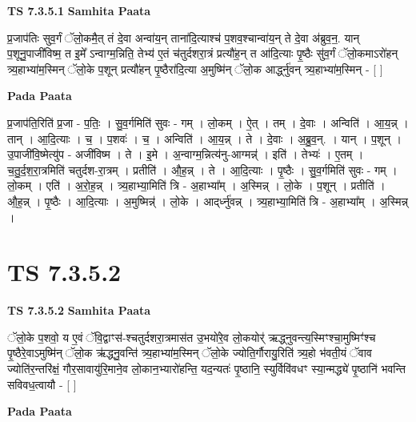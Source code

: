 \documentclass[17pt]{extarticle}
\begin{document}
\textbf{TS 7.3.5.1 } \newline
\textbf{Samhita Paata} \newline

प्र॒जाप॑तिः सुव॒र्गं ॅलो॒कमै॒त् तं दे॒वा अन्वा॑य॒न् ताना॑दि॒त्याश्च॑ प॒शव॒श्चान्वा॑य॒न् ते दे॒वा अ॑ब्रुव॒न॒. यान् प॒शूनु॒पाजी॑विष्म॒ त इ॒मे᳚ ऽन्वाग्म॒न्निति॒ तेभ्य॑ ए॒तं च॑तुर्दशरा॒त्रं प्रत्यौ॑ह॒न् त आ॑दि॒त्याः पृ॒ष्ठैः सु॑व॒र्गं ॅलो॒कमाऽरो॑हन् त्र्य॒हाभ्या॑म॒स्मिन् ॅलो॒के प॒शून् प्रत्यौ॑हन् पृ॒ष्ठैरा॑दि॒त्या अ॒मुष्मि॑न् ॅलो॒क आर्द्ध्नु॑वन् त्र्य॒हाभ्या॑म॒स्मिन् - [  ] \newline

\textbf{Pada Paata} \newline

प्र॒जाप॑ति॒रिति॑ प्र॒जा - प॒तिः॒ । सु॒व॒र्गमिति॑ सुवः - गम् । लो॒कम् । ऐ॒त् । तम् । दे॒वाः । अन्विति॑ । आ॒य॒न्न् । तान् । आ॒दि॒त्याः । च॒ । प॒शवः॑ । च॒ । अन्विति॑ । आ॒य॒न्न् । ते । दे॒वाः । अ॒ब्रु॒व॒न्. । यान् । प॒शून् । उ॒पाजी॑वि॒ष्मेत्यु॑प - अजी॑विष्म । ते । इ॒मे । अ॒न्वाग्म॒न्नित्य॑नु-आग्मन्न्॑ । इति॑ । तेभ्यः॑ । ए॒तम् । च॒तु॒र्द॒श॒रा॒त्रमिति॑ चतुर्दश-रा॒त्रम् । प्रतीति॑ । औ॒ह॒न्न् । ते । आ॒दि॒त्याः । पृ॒ष्ठैः । सु॒व॒र्गमिति॑ सुवः - गम् । लो॒कम् । एति॑ । अ॒रो॒ह॒न्न् । त्र्य॒हाभ्या॒मिति॑ त्रि - अ॒हाभ्या᳚म् । अ॒स्मिन्न् । लो॒के । प॒शून् । प्रतीति॑ । औ॒ह॒न्न् । पृ॒ष्ठैः । आ॒दि॒त्याः । अ॒मुष्मिन्न्॑ । लो॒के । आद्‌र्ध्नु॑वन्न् । त्र्य॒हाभ्या॒मिति॑ त्रि - अ॒हाभ्या᳚म् । अ॒स्मिन्न् ।  \newline




\section*{ TS 7.3.5.2 }

\textbf{TS 7.3.5.2 } \newline
\textbf{Samhita Paata} \newline

ॅलो॒के प॒शवो॒ य ए॒वं ॅवि॒द्वाꣳस॑-श्चतुर्दशरा॒त्रमास॑त उ॒भयो॑रे॒व लो॒कयोर्॑ ऋद्ध्नुवन्त्य॒स्मिꣳश्चा॒मुष्मिꣳ॑श्च पृ॒ष्ठैरे॒वाऽमुष्मि॑न् ॅलो॒क ऋ॑द्ध्नु॒वन्ति॑ त्र्य॒हाभ्या॑म॒स्मिन् ॅलो॒के ज्योति॒र्गौरायु॒रिति॑ त्र्य॒हो भ॑वती॒यं ॅवाव ज्योति॑र॒न्तरि॑क्षं॒ गौर॒सावायु॑रि॒माने॒व लो॒कान॒भ्यारो॑हन्ति॒ यद॒न्यतः॑ पृ॒ष्ठानि॒ स्युर्विवि॑वधꣳ स्या॒न्मद्ध्ये॑ पृ॒ष्ठानि॑ भवन्ति सविवध॒त्वायौ - [  ] \newline

\textbf{Pada Paata} \newline
\end{document}
